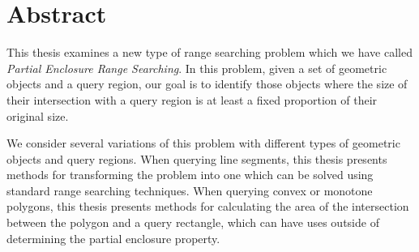 \chapter*{Abstract}

This thesis examines a new type of range searching problem which we have called \emph{Partial Enclosure Range Searching}. 
In this problem, given a set of geometric objects and a query region, our goal is to identify those objects where the size of their intersection with a query region is at least a fixed proportion of their original size.

We consider several variations of this problem with different types of geometric objects and query regions. 
When querying line segments, this thesis presents methods for transforming the problem into one which can be solved using standard range searching techniques.
When querying convex or monotone polygons, this thesis presents methods for calculating the area of the intersection between the polygon and a query rectangle, which can have uses outside of determining the partial enclosure property.

